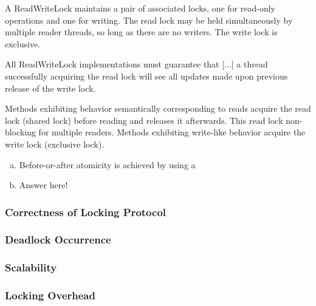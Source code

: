 \documentclass[11pt,a4paper,english]{article}
\begin{document}
\begin{displayquote}
A ReadWriteLock maintains a pair of associated locks, one for read-only operations and one for writing. The read lock may be held simultaneously by multiple reader threads, so long as there are no writers. The write lock is exclusive.

All ReadWriteLock implementations must guarantee that [...] a thread successfully acquiring the read lock will see all updates made upon previous release of the write lock.
\end{displayquote}
Methods exhibiting behavior semantically corresponding to reads acquire the read lock (shared lock) before reading and releases it afterwards. This read lock non-blocking for multiple readers. Methods exhibiting write-like behavior acquire the write lock (exclusive lock).
\begin{enumerate}[(a)]
\item Before-or-after atomicity is achieved by using a 
\item{Answer here!}
\end{enumerate}

\subsubsection{Correctness of Locking Protocol}
\subsubsection{Deadlock Occurrence}
\subsubsection{Scalability}
\subsubsection{Locking Overhead}
\end{document}
